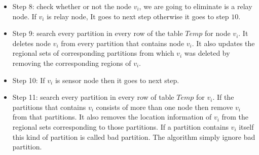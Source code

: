 \documentclass[11pt]{article}
\begin{document}
\begin{itemize}
\item Step 8: check whether or not the node $v_i$, we are going to eliminate is a relay node. If $v_i$ is relay node, It goes to next step otherwise it goes to step $10$.
\item Step 9: search every partition in every row of the table $Temp$ for node $v_i$. It deletes node $v_i$ from every partition that contains node $v_i$. It also updates the regional sets of corresponding partitions from which $v_i$ was deleted by removing the corresponding regions of $v_i$.
\item Step 10: If $v_i$ is sensor node then it goes to next step.
\item Step 11: search every partition in every row of table $Temp$ for $v_i$. If the partitions that contains $v_i$ consists of more than one node then remove $v_i$ from that partitions. It also removes the location information of $v_i$ from the regional sets corresponding to those partitions.
If a partition contains $v_i$ itself this kind of partition is called bad partition. The algorithm simply ignore bad partition.
\end{itemize}
\end{document}

